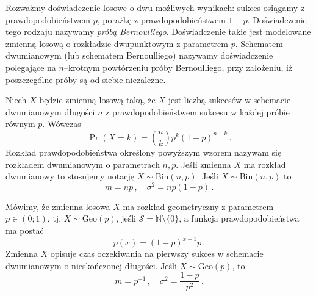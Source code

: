 \documentclass{myclass}
\numberwithin{equation}{subsection}
\begin{document}
\begin{definition}
Rozważmy doświadczenie losowe o dwu możliwych wynikach: sukces osiągamy z prawdopodobieństwem \(p\),
porażkę z prawdopodobieństwem \(1-p\). Doświadczenie tego rodzaju nazywamy \emph{próbą
Bernoulliego}. Doświadczenie takie jest modelowane zmienną losową o rozkładzie dwupunktowym z
parametrem \(p\). Schematem dwumianowym (lub schematem Bernoulliego) nazywamy doświadczenie
polegające na \(n\)--krotnym powtórzeniu próby Bernoulliego, przy założeniu, iż poszczególne próby
są od siebie niezależne.
\end{definition}

\begin{definition}
Niech \(X\) będzie zmienną losową taką, że \(X\) jest liczbą sukcesów w schemacie dwumianowym
długości \(n\) z prawdopodobieństwem sukcesu w każdej próbie równym \(p\). Wówczas
\begin{equation*}
    \Pr(X = k) = {n \choose k} p^k (1 - p)^{n-k}\,.
\end{equation*}
Rozkład prawdopodobieństwa określony powyższym wzorem nazywam się rozkładem dwumianowym o
parametrach \(n,p\). Jeśli zmienna \(X\) ma rozkład dwumianowy to stosujemy notację \(X \sim
\mathrm{Bin}(n,p)\). Jeśli \(X \sim \mathrm{Bin}(n,p)\) to
\begin{equation*}
    m = np\,,\quad \sigma^2 = np(1-p)\,.
\end{equation*}
\end{definition}

\begin{definition}
Mówimy, że zmienna losowa \(X\) ma rozkład geometryczny z parametrem \(p \in (0;1)\), tj. \(X \sim
\mathrm{Geo}(p)\), jeśli \(\mathcal{S} = \mathbb{N} \setminus \{0\}\), a funkcja prawdopodobieństwa
ma postać
\begin{equation*}
    p(x) = (1-p)^{x-1}p\,.
\end{equation*}
Zmienna \(X\) opisuje czas oczekiwania na pierwszy sukces w schemacie dwumianowym o nieskończonej
długości. Jeśli \(X \sim \mathrm{Geo}(p)\), to
\begin{equation*}
    m = p^{-1}\,,\quad \sigma^2 = \frac{1 - p}{p^2}\,.
\end{equation*}
\end{definition}
\end{document}
